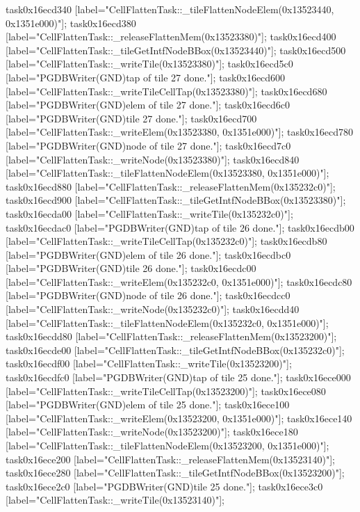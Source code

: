 {	task0x16ecd340 [label="CellFlattenTask::_tileFlattenNodeElem(0x13523440, 0x1351e000)"];
	task0x16ecd380 [label="CellFlattenTask::_releaseFlattenMem(0x13523380)"];
	task0x16ecd400 [label="CellFlattenTask::_tileGetIntfNodeBBox(0x13523440)"];
	task0x16ecd500 [label="CellFlattenTask::_writeTile(0x13523380)"];
	task0x16ecd5c0 [label="PGDBWriter(GND)\nCell tap of tile 27 done."];
	task0x16ecd600 [label="CellFlattenTask::_writeTileCellTap(0x13523380)"];
	task0x16ecd680 [label="PGDBWriter(GND)\nCell elem of tile 27 done."];
	task0x16ecd6c0 [label="PGDBWriter(GND)\nCell tile 27 done."];
	task0x16ecd700 [label="CellFlattenTask::_writeElem(0x13523380, 0x1351e000)"];
	task0x16ecd780 [label="PGDBWriter(GND)\nCell node of tile 27 done."];
	task0x16ecd7c0 [label="CellFlattenTask::_writeNode(0x13523380)"];
	task0x16ecd840 [label="CellFlattenTask::_tileFlattenNodeElem(0x13523380, 0x1351e000)"];
	task0x16ecd880 [label="CellFlattenTask::_releaseFlattenMem(0x135232c0)"];
	task0x16ecd900 [label="CellFlattenTask::_tileGetIntfNodeBBox(0x13523380)"];
	task0x16ecda00 [label="CellFlattenTask::_writeTile(0x135232c0)"];
	task0x16ecdac0 [label="PGDBWriter(GND)\nCell tap of tile 26 done."];
	task0x16ecdb00 [label="CellFlattenTask::_writeTileCellTap(0x135232c0)"];
	task0x16ecdb80 [label="PGDBWriter(GND)\nCell elem of tile 26 done."];
	task0x16ecdbc0 [label="PGDBWriter(GND)\nCell tile 26 done."];
	task0x16ecdc00 [label="CellFlattenTask::_writeElem(0x135232c0, 0x1351e000)"];
	task0x16ecdc80 [label="PGDBWriter(GND)\nCell node of tile 26 done."];
	task0x16ecdcc0 [label="CellFlattenTask::_writeNode(0x135232c0)"];
	task0x16ecdd40 [label="CellFlattenTask::_tileFlattenNodeElem(0x135232c0, 0x1351e000)"];
	task0x16ecdd80 [label="CellFlattenTask::_releaseFlattenMem(0x13523200)"];
	task0x16ecde00 [label="CellFlattenTask::_tileGetIntfNodeBBox(0x135232c0)"];
	task0x16ecdf00 [label="CellFlattenTask::_writeTile(0x13523200)"];
	task0x16ecdfc0 [label="PGDBWriter(GND)\nCell tap of tile 25 done."];
	task0x16ece000 [label="CellFlattenTask::_writeTileCellTap(0x13523200)"];
	task0x16ece080 [label="PGDBWriter(GND)\nCell elem of tile 25 done."];
	task0x16ece100 [label="CellFlattenTask::_writeElem(0x13523200, 0x1351e000)"];
	task0x16ece140 [label="CellFlattenTask::_writeNode(0x13523200)"];
	task0x16ece180 [label="CellFlattenTask::_tileFlattenNodeElem(0x13523200, 0x1351e000)"];
	task0x16ece200 [label="CellFlattenTask::_releaseFlattenMem(0x13523140)"];
	task0x16ece280 [label="CellFlattenTask::_tileGetIntfNodeBBox(0x13523200)"];
	task0x16ece2c0 [label="PGDBWriter(GND)\nCell tile 25 done."];
	task0x16ece3c0 [label="CellFlattenTask::_writeTile(0x13523140)"];
}
